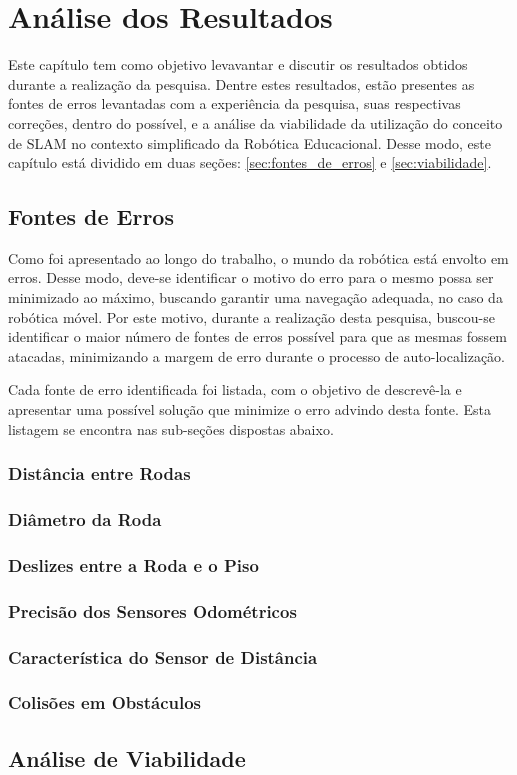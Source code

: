 \chapter[Análise dos Resultados]{Análise dos Resultados}

Este capítulo tem como objetivo levavantar e discutir os resultados obtidos durante a realização da pesquisa. Dentre estes resultados,
estão presentes as fontes de erros levantadas com a experiência da pesquisa, suas respectivas correções, dentro do possível, e a análise da
viabilidade da utilização do conceito de SLAM no contexto simplificado da Robótica Educacional. Desse modo, este capítulo está dividido
em duas seções: \ref{sec:fontes_de_erros} e \ref{sec:viabilidade}.

\section{Fontes de Erros}

Como foi apresentado ao longo do trabalho, o mundo da robótica está envolto em erros. Desse modo, deve-se identificar o motivo do erro
para o mesmo possa ser minimizado ao máximo, buscando garantir uma navegação adequada, no caso da robótica móvel.
Por este motivo, durante a realização desta pesquisa, buscou-se identificar o maior número de fontes de erros possível para que as mesmas fossem
atacadas, minimizando a margem de erro durante o processo de auto-localização.

Cada fonte de erro identificada foi listada, com o objetivo de descrevê-la e apresentar uma possível solução que minimize o erro
advindo desta fonte. Esta listagem se encontra nas sub-seções dispostas abaixo.

\subsection{Distância entre Rodas}

\subsection{Diâmetro da Roda}

\subsection{Deslizes entre a Roda e o Piso}

\subsection{Precisão dos Sensores Odométricos}

\subsection{Característica do Sensor de Distância}

\subsection{Colisões em Obstáculos}

\section{Análise de Viabilidade}
